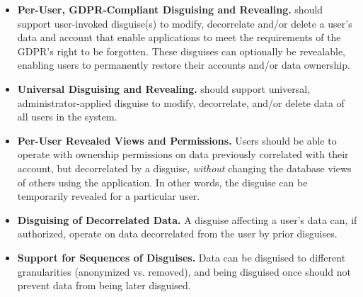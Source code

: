 \begin{itemize}
    \item\textbf{Per-User, GDPR-Compliant Disguising and Revealing.}
\sys should support user-invoked disguise(s) to modify, decorrelate and/or delete a user's data and
account that enable applications to meet the requirements of the GDPR's right to be forgotten.
%
These disguises can optionally be revealable, enabling users to \eg permanently restore their accounts and/or data ownership.

\item\textbf{Universal Disguising and Revealing.}
\sys should support universal, administrator-applied disguise to modify, decorrelate, and/or delete
        data of all users in the system.
%

\item\textbf{Per-User Revealed Views and Permissions.}
Users should be able to operate with ownership permissions on data previously correlated with their
account, but decorrelated by a disguise, \emph{without} changing the database views of others using
the application. In other words, the disguise can be temporarily revealed for a particular user.

\item\textbf{Disguising of Decorrelated Data.}
A disguise affecting a user's data can, if authorized, operate on data decorrelated from the user by
prior disguises.

\item\textbf{Support for Sequences of Disguises.}
Data can be disguised to different granularities (\eg anonymized vs. removed), and being disguised
once should not prevent data from being later disguised.
\end{itemize}

